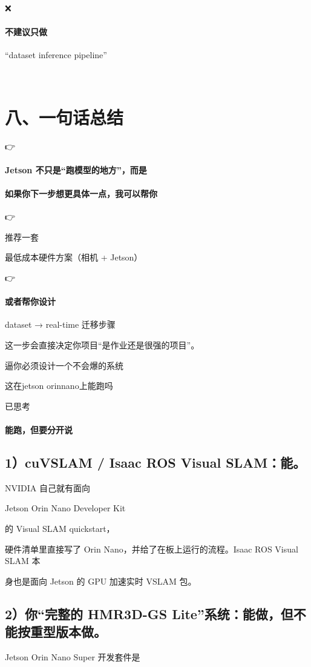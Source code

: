 \documentclass[12pt]{article}
\begin{document}
❌

\paragraph{不建议只做}
“dataset inference pipeline”

🧭

\section{八、一句话总结}
👉

\paragraph{Jetson 不只是“跑模型的地方”，而是}
\paragraph{如果你下一步想更具体一点，我可以帮你}
👉

推荐一套

最低成本硬件方案（相机 + Jetson）

👉

\paragraph{或者帮你设计}
dataset → real-time 迁移步骤

这一步会直接决定你项目“是作业还是很强的项目”。

逼你必须设计一个不会爆的系统

这在jetson orinnano上能跑吗

已思考

\paragraph{能跑，但要分开说}
\subsection{1）cuVSLAM / Isaac ROS Visual SLAM：能。}
NVIDIA 自己就有面向

Jetson Orin Nano Developer Kit

的 Visual SLAM quickstart，

硬件清单里直接写了 Orin Nano，并给了在板上运行的流程。Isaac ROS Visual SLAM 本

身也是面向 Jetson 的 GPU 加速实时 VSLAM 包。

\subsection{2）你“完整的 HMR3D-GS Lite”系统：能做，但不能按重型版本做。}
Jetson Orin Nano Super 开发套件是
\end{document}
